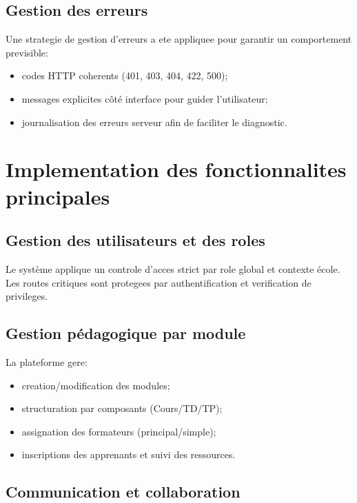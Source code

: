 \documentclass[12pt,a4paper,oneside]{report}
\begin{document}
\subsection{Gestion des erreurs}

Une strategie de gestion d'erreurs a ete appliquee pour garantir un comportement previsible:
\begin{itemize}
  \item codes HTTP coherents (401, 403, 404, 422, 500);
  \item messages explicites côté interface pour guider l'utilisateur;
  \item journalisation des erreurs serveur afin de faciliter le diagnostic.
\end{itemize}

\section{Implementation des fonctionnalites principales}

\subsection{Gestion des utilisateurs et des roles}

Le système applique un controle d'acces strict par role global et contexte école. Les routes critiques sont protegees par authentification et verification de privileges.

\subsection{Gestion pédagogique par module}

La plateforme gere:
\begin{itemize}
  \item creation/modification des modules;
  \item structuration par composants (Cours/TD/TP);
  \item assignation des formateurs (principal/simple);
  \item inscriptions des apprenants et suivi des ressources.
\end{itemize}

\subsection{Communication et collaboration}
\end{document}
